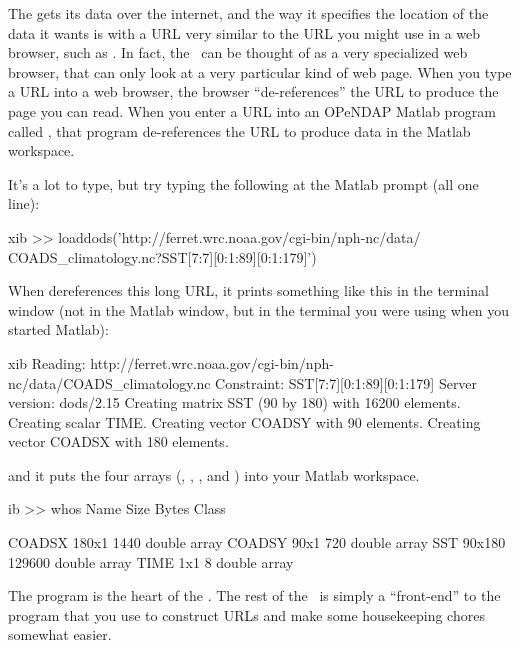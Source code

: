 The \GUI gets its data over the internet, and the way it specifies the
location of the data it wants is with a URL very similar to the URL
you might use in a web browser, such as .  In fact, the
\GUI\ can be thought of as a very specialized web browser, that can
only look at a very particular kind of web page.  When you type a URL
into a web browser, the browser ``de-references'' the URL to produce
the page you can read.  When you enter a URL into an OPeNDAP Matlab
program called , that program de-references the URL to
produce data in the Matlab workspace.

It's a lot to type, but try typing the following at the Matlab prompt
(all one line):

\begin{vcode}{xib}
>> loaddods('http://ferret.wrc.noaa.gov/cgi-bin/nph-nc/data/
          COADS_climatology.nc?SST[7:7][0:1:89][0:1:179]') 
\end{vcode}

When  dereferences this long URL, it prints something
like this in the terminal window (not in the Matlab window, but in the
terminal you were using when you started Matlab):

\begin{vcode}{xib}
Reading: http://ferret.wrc.noaa.gov/cgi-bin/nph-nc/data/COADS_climatology.nc
  Constraint: SST[7:7][0:1:89][0:1:179]
Server version: dods/2.15
Creating matrix SST (90 by 180) with 16200 elements.
Creating scalar TIME.
Creating vector COADSY with 90 elements.
Creating vector COADSX with 180 elements.
\end{vcode}

and it puts the four arrays (, , , and
) into your Matlab workspace.

\begin{vcode}{ib}
>> whos
  Name               Size         Bytes  Class

  COADSX           180x1           1440  double array
  COADSY            90x1            720  double array
  SST               90x180       129600  double array
  TIME               1x1              8  double array
\end{vcode}

The  program is the heart of the \GUI .  The rest of the
\GUI\ is simply a ``front-end'' to the  program that you
use to construct URLs and make some housekeeping chores somewhat
easier.

